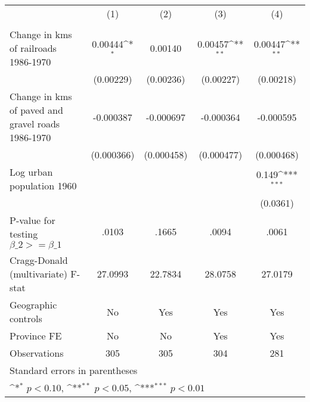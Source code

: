 {
\def\sym#1{\ifmmode^{#1}\else\(^{#1}\)\fi}
\begin{tabular}{l*{4}{c}}
\hline\hline
                &\multicolumn{1}{c}{(1)}&\multicolumn{1}{c}{(2)}&\multicolumn{1}{c}{(3)}&\multicolumn{1}{c}{(4)}\\
                &\multicolumn{1}{c}{}&\multicolumn{1}{c}{}&\multicolumn{1}{c}{}&\multicolumn{1}{c}{}\\
\hline
Change in kms of railroads 1986-1970&  0.00444\sym{*}  &  0.00140         &  0.00457\sym{**} &  0.00447\sym{**} \\
                &(0.00229)         &(0.00236)         &(0.00227)         &(0.00218)         \\
[1em]
Change in kms of paved and gravel roads 1986-1970&-0.000387         &-0.000697         &-0.000364         &-0.000595         \\
                &(0.000366)         &(0.000458)         &(0.000477)         &(0.000468)         \\
[1em]
Log urban population 1960&                  &                  &                  &    0.149\sym{***}\\
                &                  &                  &                  & (0.0361)         \\
\hline
P-value for testing $\beta\_{2} >= \beta\_{1}$&    .0103         &    .1665         &    .0094         &    .0061         \\
Cragg-Donald (multivariate) F-stat&  27.0993         &  22.7834         &  28.0758         &  27.0179         \\
Geographic controls&       No         &      Yes         &      Yes         &      Yes         \\
Province FE     &       No         &       No         &      Yes         &      Yes         \\
Observations    &      305         &      305         &      304         &      281         \\
\hline\hline
\multicolumn{5}{l}{\footnotesize Standard errors in parentheses}\\
\multicolumn{5}{l}{\footnotesize \sym{*} \(p<0.10\), \sym{**} \(p<0.05\), \sym{***} \(p<0.01\)}\\
\end{tabular}
}
